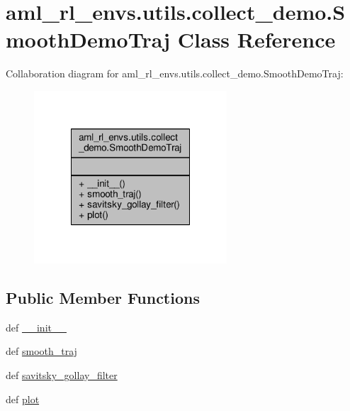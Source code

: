 \hypertarget{classaml__rl__envs_1_1utils_1_1collect__demo_1_1_smooth_demo_traj}{\section{aml\-\_\-rl\-\_\-envs.\-utils.\-collect\-\_\-demo.\-Smooth\-Demo\-Traj Class Reference}
\label{classaml__rl__envs_1_1utils_1_1collect__demo_1_1_smooth_demo_traj}
}


Collaboration diagram for aml\-\_\-rl\-\_\-envs.\-utils.\-collect\-\_\-demo.\-Smooth\-Demo\-Traj\-:
\nopagebreak
\begin{figure}[H]
\begin{center}
\leavevmode
\includegraphics[width=204pt]{classaml__rl__envs_1_1utils_1_1collect__demo_1_1_smooth_demo_traj__coll__graph}
\end{center}
\end{figure}
\subsection*{Public Member Functions}
\begin{DoxyCompactItemize}
\item 
def \hyperlink{classaml__rl__envs_1_1utils_1_1collect__demo_1_1_smooth_demo_traj_a31074d37701acc6650d272337db5b488}{\-\_\-\-\_\-init\-\_\-\-\_\-}
\item 
def \hyperlink{classaml__rl__envs_1_1utils_1_1collect__demo_1_1_smooth_demo_traj_aae8e664e639b49b5381ac3407e51496a}{smooth\-\_\-traj}
\item 
def \hyperlink{classaml__rl__envs_1_1utils_1_1collect__demo_1_1_smooth_demo_traj_a2e36204c4e5ebcb238da048b2f156b6d}{savitsky\-\_\-gollay\-\_\-filter}
\item 
def \hyperlink{classaml__rl__envs_1_1utils_1_1collect__demo_1_1_smooth_demo_traj_ad187102e7dc7ffd7e2061ce2ef8b5c4e}{plot}
\end{DoxyCompactItemize}


